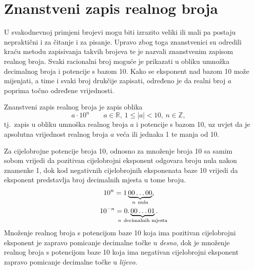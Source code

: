 

\section{Znanstveni zapis realnog broja}\label{sec:znanstveni-zapis-realnog-broja}
U svakodnevnoj primjeni brojevi mogu biti izrazito veliki ili mali pa postaju nepraktični i za čitanje i za pisanje.
Upravo zbog toga znanstvenici su odredili kraću metodu zapisivanja takvih brojeva te je nazvali znanstvenim zapisom realnog broja.
Svaki racionalni broj moguće je prikazati u obliku umnožka decimalnog broja i potencije s bazom 10.
Kako se eksponent nad bazom 10 može mijenjati, a time i svaki broj drukčije zapisati, određeno je da realni broj $a$ poprima točno određene vrijednosti.

Znanstveni zapis realnog broja je zapis oblika
\[ a \cdot 10^n \qquad a \in \mathbb{R}, \ 1 \leq |a| < 10, \ n \in \mathbb{Z}, \]
tj.\ zapis u obliku umnoška realnog broja $a$ i potencije s bazom 10, uz uvjet da je apsolutna vrijednost realnog broja $a$ veća ili jednaka 1 te manja od 10.

Za cijelobrojne potencije broja 10, odnosno za množenje broja 10 sa samim sobom vrijedi da pozitivan cijelobrojni eksponent odgovara broju nula nakon znamenke 1, dok kod negativnih cijelobrojnih eksponenata baze 10 vrijedi da eksponent predstavlja broj decimalnih mjesta u tome broju.
\begin{gather*}
    10^n = 1\underbrace{00 \ldots 00}_{\mathclap{n \ \text{nula}}},\\
    10^{-n} = 0.\underbrace{00 \ldots 01}_{\mathclap{n \ \text{decimalnih mjesta}}}.
\end{gather*}
Množenje realnog broja s potencijom baze 10 koja ima pozitivan cijelobrojni eksponent je zapravo pomicanje decimalne točke u \emph{desno}, dok je množenje realnog broja s potencijom baze 10 koja ima negativan cijelobrojni eksponent zapravo pomicanje decimalne točke u \emph{lijevo}.